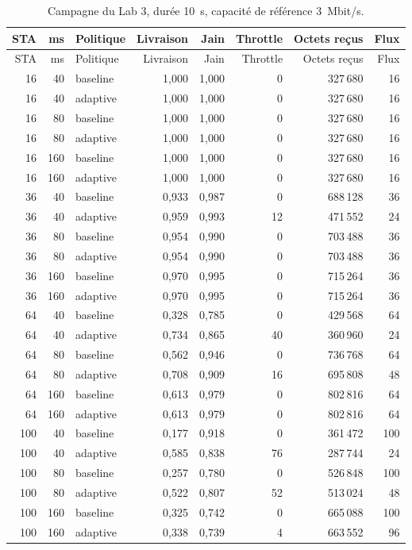 \documentclass[11pt,a4paper]{article}
\begin{document}
\begin{longtable}{@{}rrlrrrrr@{}}
\caption{Campagne du Lab 3, durée 10~s, capacité de référence 3~Mbit/s.}\\
\toprule
STA & ms & Politique & Livraison & Jain & Throttle & Octets reçus & Flux \\
\midrule
\endfirsthead
\toprule
STA & ms & Politique & Livraison & Jain & Throttle & Octets reçus & Flux \\
\midrule
\endhead
16 & 40 & baseline & 1,000 & 1,000 & 0 & 327\,680 & 16 \\
16 & 40 & adaptive & 1,000 & 1,000 & 0 & 327\,680 & 16 \\
16 & 80 & baseline & 1,000 & 1,000 & 0 & 327\,680 & 16 \\
16 & 80 & adaptive & 1,000 & 1,000 & 0 & 327\,680 & 16 \\
16 & 160 & baseline & 1,000 & 1,000 & 0 & 327\,680 & 16 \\
16 & 160 & adaptive & 1,000 & 1,000 & 0 & 327\,680 & 16 \\
36 & 40 & baseline & 0,933 & 0,987 & 0 & 688\,128 & 36 \\
36 & 40 & adaptive & 0,959 & 0,993 & 12 & 471\,552 & 24 \\
36 & 80 & baseline & 0,954 & 0,990 & 0 & 703\,488 & 36 \\
36 & 80 & adaptive & 0,954 & 0,990 & 0 & 703\,488 & 36 \\
36 & 160 & baseline & 0,970 & 0,995 & 0 & 715\,264 & 36 \\
36 & 160 & adaptive & 0,970 & 0,995 & 0 & 715\,264 & 36 \\
64 & 40 & baseline & 0,328 & 0,785 & 0 & 429\,568 & 64 \\
64 & 40 & adaptive & 0,734 & 0,865 & 40 & 360\,960 & 24 \\
64 & 80 & baseline & 0,562 & 0,946 & 0 & 736\,768 & 64 \\
64 & 80 & adaptive & 0,708 & 0,909 & 16 & 695\,808 & 48 \\
64 & 160 & baseline & 0,613 & 0,979 & 0 & 802\,816 & 64 \\
64 & 160 & adaptive & 0,613 & 0,979 & 0 & 802\,816 & 64 \\
100 & 40 & baseline & 0,177 & 0,918 & 0 & 361\,472 & 100 \\
100 & 40 & adaptive & 0,585 & 0,838 & 76 & 287\,744 & 24 \\
100 & 80 & baseline & 0,257 & 0,780 & 0 & 526\,848 & 100 \\
100 & 80 & adaptive & 0,522 & 0,807 & 52 & 513\,024 & 48 \\
100 & 160 & baseline & 0,325 & 0,742 & 0 & 665\,088 & 100 \\
100 & 160 & adaptive & 0,338 & 0,739 & 4 & 663\,552 & 96 \\
\bottomrule
\end{longtable}
\end{document}
